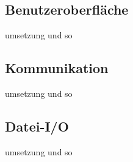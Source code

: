 \subsection{Benutzeroberfläche}
umsetzung und so

\subsection{Kommunikation}
umsetzung und so

\subsection*{Datei-I/O}
umsetzung und so
